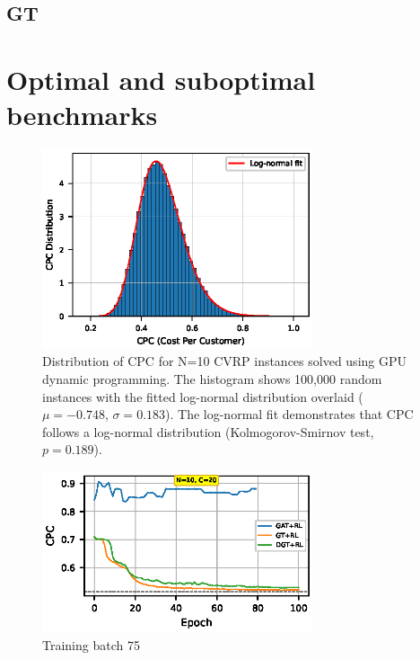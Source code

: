 \documentclass[a4paper,twoside]{article}
\begin{document}
\subsection{GT}


\section{Optimal and suboptimal benchmarks}


\begin{figure}[t!]
\centering
   \includegraphics[width=80mm]{figures/cpc_histogram_paper_100k.eps}
   \caption{Distribution of CPC for N=10 CVRP instances solved using GPU dynamic programming. The histogram shows 100,000 random instances with the fitted log-normal distribution overlaid ($\mu=-0.748$, $\sigma=0.183$). The log-normal fit demonstrates that CPC follows a log-normal distribution (Kolmogorov-Smirnov test, $p=0.189$).}
\label{fig:benchmark}
\end{figure}


\begin{figure}[t!]
\centering
   \includegraphics[width=80mm]{figures/tiny_n10.eps}
   \caption{Training batch 75}
\label{fig:benchmark}
\end{figure}
\end{document}
